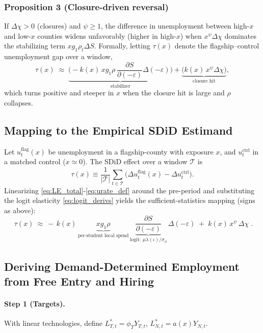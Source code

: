 	
	
\subsubsection*{Proposition 3 (Closure-driven reversal)}
If $\Delta\chi>0$ (closures) and $\psi\ge 1$, the difference in unemployment between high-$x$ and low-$x$ counties widens unfavorably (higher in high-$x$) when $x^\psi \Delta\chi$ dominates the stabilizing term $x g_1\rho_t \Delta S$. Formally, letting $\tau(x)$ denote the flagship–control unemployment gap over a window,
\[
\tau(x)\;\approx\; \underbrace{\Big(-k(x)\,x g_1\rho\,\frac{\partial S}{\partial(-\varepsilon)}\Delta(-\varepsilon)\Big)}_{\text{stabilizer}}
+\underbrace{\big(k(x)\,x^\psi \Delta\chi\big)}_{\text{closure hit}},
\]
which turns positive and steeper in $x$ when the closure hit is large and $\rho$ collapses.

\subsection*{Mapping to the Empirical SDiD Estimand}
Let $u^{\text{flag}}_t(x)$ be unemployment in a flagship-county with exposure $x$, and $u^{\text{ctrl}}_t$ in a matched control ($x\simeq 0$). The SDiD effect over a window $\mathcal T$ is
\begin{equation}
	\tau(x)\equiv \frac{1}{|\mathcal T|}\sum_{t\in\mathcal T}\Big(\Delta u^{\text{flag}}_t(x)-\Delta u^{\text{ctrl}}_t\Big).
\end{equation}
Linearizing \eqref{eq:LE_total}-\eqref{eq:urate_def} around the pre-period and substituting the logit elasticity \eqref{eq:logit_derivs} yields the sufficient-statistics mapping (signs as above):
\begin{equation}
	\boxed{\;
		\tau(x)\ \approx\ -\,k(x)\,\underbrace{x g_1\rho}_{\text{per-student local spend}}\,
		\underbrace{\frac{\partial S}{\partial(-\varepsilon)}}_{\text{logit: }\mu\lambda(\iota)/\sigma_\phi}\,
		\Delta(-\varepsilon)
		\;+\; k(x)\,x^\psi\,\Delta\chi\; }.
	\label{eq:sdid_mapping}
\end{equation}

\subsection*{Deriving Demand-Determined Employment from Free Entry and Hiring}
\label{subsec:derivation_targets}
\paragraph{Step 1 (Targets).} With linear technologies, define $L^\ast_{T,t}=\phi_TY_{T,t}$, $L^\ast_{N,t}=a(x)Y_{N,t}$.

